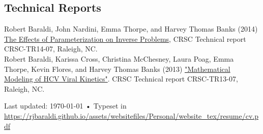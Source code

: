 \documentclass[10pt, a4paper]{article}
\newcommand{\years}[1]{\marginnote{\scriptsize #1}}
\begin{document}
\subsection*{Technical Reports}
\noindent
\years{2014} Robert Baraldi, John Nardini, Emma Thorpe, and Harvey Thomas Banks (2014) \href{ http://www.ncsu.edu/crsc/reports/ftp/pdf/crsc-tr14-07.pdf}{The Effects of Parameterization on Inverse Problems}, CRSC Technical report CRSC-TR14-07, Raleigh, NC.\\
\noindent
\years{2013} Robert Baraldi, Karissa Cross, Christina McChesney, Laura Poag, Emma Thorpe, Kevin Flores, and Harvey Thomas Banks (2013) \href{http://www.ncsu.edu/crsc/reports/ftp/pdf/crsc-tr13-07.pdf}{"Mathematical Modeling of HCV Viral Kinetics"}. CRSC Technical report CRSC-TR13-07, Raleigh, NC.\\


\vfill{}

\begin{center}
{\scriptsize  Last updated: \today\- •\-
Typeset in \href{http://nitens.org/taraborelli/cvtex}{
\XeTeX }\\
\href{http://rjbaraldi.github.io/cv}{https://rjbaraldi.github.io/assets/websitefiles/Personal/website\_tex/resume/cv.pdf}}
\end{center}
\end{document}
